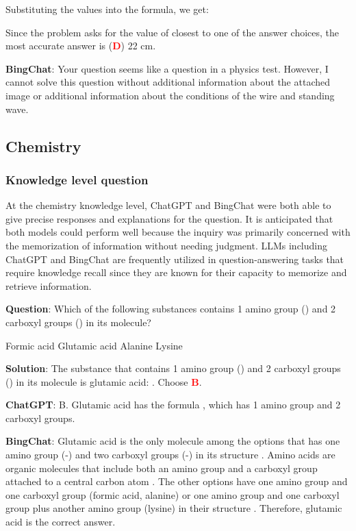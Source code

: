 \documentclass{article}
\begin{document}
{\begin{mdframed}[linewidth=1pt,linecolor=red]
		Substituting the values into the formula, we get:
		
		Since the problem asks for the value of  closest to one of the answer choices, the most accurate answer is (\textcolor{red}{\textbf{D}}) 22 cm.
		
		\textbf{BingChat}: Your question seems like a question in a physics test. However, I cannot solve this question without additional information about the attached image or additional information about the conditions of the wire and standing wave.
		
		
	\end{mdframed}	

	\subsection{Chemistry}
	\label{VNHSGE_Che}
	
	\subsubsection{Knowledge level question}
	\label{VNHSGE_Che_K}
	
	At the chemistry knowledge level, ChatGPT and BingChat were both able to give precise responses and explanations for the question. It is anticipated that both models could perform well because the inquiry was primarily concerned with the memorization of information without needing judgment. LLMs including ChatGPT and BingChat are frequently utilized in question-answering tasks that require knowledge recall since they are known for their capacity to memorize and retrieve information.
	
	
	\begin{mdframed}[linewidth=1pt,linecolor=red] \textbf{Question}: Which of the following substances contains 1 amino group () and 2 carboxyl groups () in its molecule? 
		
		\begin{oneparchoices}
			\choice Formic acid
			\choice Glutamic acid
			\choice Alanine
			\choice Lysine 
		\end{oneparchoices}
		
		\textbf{Solution}: The substance that contains 1 amino group () and 2 carboxyl groups () in its molecule is glutamic acid: . Choose \textcolor{red}{\textbf{B}}.
		
		\textbf{ChatGPT}: B. Glutamic acid has the formula , which has 1 amino group and 2 carboxyl groups.


		\textbf{BingChat}: 
		Glutamic acid is the only molecule among the options that has one amino group (-) and two carboxyl groups (-) in its structure . Amino acids are organic molecules that include both an amino group and a carboxyl group attached to a central carbon atom . The other options have one amino group and one carboxyl group (formic acid, alanine) or one amino group and one carboxyl group plus another amino group (lysine) in their structure . Therefore, glutamic acid is the correct answer.
		

\end{mdframed}}
\end{document}
